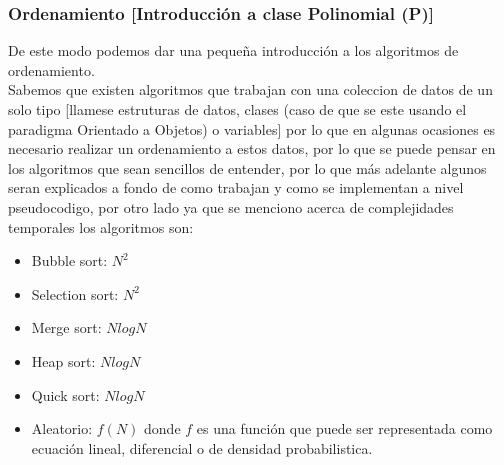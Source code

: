 \documentclass[10pt,executivepaper]{article}
\begin{document}
\subsubsection{Ordenamiento [Introducción a clase Polinomial (P)]}
De este modo podemos dar una pequeña introducción a los algoritmos de ordenamiento.\\
Sabemos que existen algoritmos que trabajan con una coleccion de datos de un solo tipo [llamese estruturas de datos, clases (caso de que se este usando el paradigma Orientado a Objetos) o variables] por lo que en algunas ocasiones es necesario realizar un ordenamiento a estos datos, por lo que se puede pensar en los algoritmos que sean sencillos de entender, por lo que más adelante algunos seran explicados a fondo de como trabajan y como se implementan a nivel pseudocodigo, por otro lado ya que se menciono acerca de complejidades temporales los algoritmos son:
\begin{itemize}
  \item Bubble sort: $N^2$
  \item Selection sort: $N^2$
  \item Merge sort: $N log N$
  \item Heap sort: $N log N$
  \item Quick sort: $N log N$
  \item Aleatorio: $f(N)$ donde $f$ es una función que puede ser representada como ecuación lineal, diferencial o de densidad probabilistica.
\end{itemize}
\end{document}
